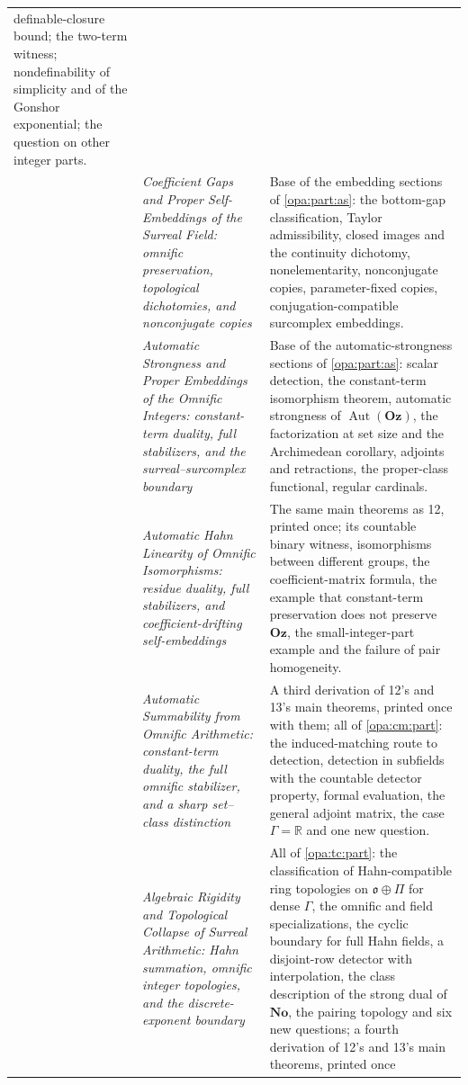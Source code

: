 \documentclass[11pt,oneside]{article}
\numberwithin{equation}{section}
\theoremstyle{definition}
\theoremstyle{remark}
\newcommand{\No}{\mathbf{No}}
\newcommand{\Oz}{\mathbf{Oz}}
\newcommand{\R}{\mathbb R}
\newcommand{\oo}{\mathfrak o}
\newcommand{\Aut}{\operatorname{Aut}}
\begin{document}
\begin{center}
\begin{longtable}{>{\raggedright\arraybackslash}p{}>{\raggedright\arraybackslash}p{}>{\raggedright\arraybackslash}p{}}
definable-closure bound; the two-term witness; nondefinability of simplicity
and of the Gonshor exponential; the question on other integer parts.\\
11 & \emph{Coefficient Gaps and Proper Self-Embeddings of the Surreal Field:
omnific preservation, topological dichotomies, and nonconjugate copies} &
Base of the embedding sections of \cref{opa:part:as}: the bottom-gap
classification, Taylor admissibility, closed images and the continuity
dichotomy, nonelementarity, nonconjugate copies, parameter-fixed copies,
conjugation-compatible surcomplex embeddings.\\
12 & \emph{Automatic Strongness and Proper Embeddings of the Omnific Integers:
constant-term duality, full stabilizers, and the surreal--surcomplex boundary} &
Base of the automatic-strongness sections of \cref{opa:part:as}: scalar
detection, the constant-term isomorphism theorem, automatic strongness of
$\Aut(\Oz)$, the factorization at set size and the Archimedean corollary,
adjoints and retractions, the proper-class functional, regular cardinals.\\
13 & \emph{Automatic Hahn Linearity of Omnific Isomorphisms: residue duality,
full stabilizers, and coefficient-drifting self-embeddings} &
The same main theorems as 12, printed once; its countable binary witness,
isomorphisms between different groups, the coefficient-matrix formula, the
example that constant-term preservation does not preserve $\Oz$, the
small-integer-part example and the failure of pair homogeneity.\\
14 & \emph{Automatic Summability from Omnific Arithmetic: constant-term duality,
the full omnific stabilizer, and a sharp set--class distinction} &
A third derivation of 12's and 13's main theorems, printed once with them; all of
\cref{opa:cm:part}: the induced-matching route to detection, detection in
subfields with the countable detector property, formal evaluation, the general
adjoint matrix, the case $\Gamma=\R$ and one new question.\\
15 & \emph{Algebraic Rigidity and Topological Collapse of Surreal Arithmetic:
Hahn summation, omnific integer topologies, and the discrete-exponent boundary} &
All of \cref{opa:tc:part}: the classification of Hahn-compatible ring topologies
on $\oo\oplus\Pi$ for dense $\Gamma$, the omnific and field specializations, the
cyclic boundary for full Hahn fields, a disjoint-row detector with interpolation,
the class description of the strong dual of $\No$, the pairing topology and six
new questions; a fourth derivation of 12's and 13's main theorems, printed once

\end{longtable}
\end{center}
\end{document}
